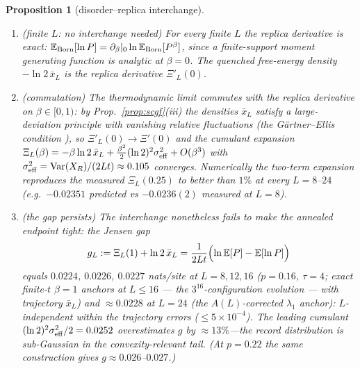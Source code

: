 \documentclass[11pt]{article}
\newtheorem{proposition}{Proposition}
\newcommand{\E}{\mathbb{E}}
\begin{document}
\begin{proposition}[disorder--replica interchange]\label{prop:replica}
\begin{enumerate}
\item[(i)] \emph{(finite $L$: no interchange needed)} For every finite $L$
      the replica derivative is exact: $\E_{\rm Born}[\ln P]
      =\partial_\beta|_0\ln\E_{\rm Born}[P^\beta]$, since a finite-support
      moment generating function is analytic at $\beta=0$.  The quenched
      free-energy density $-\ln2\,\bar x_L$ \emph{is} the replica
      derivative $\Xi'_L(0)$.
\item[(ii)] \emph{(commutation)} The thermodynamic limit commutes with the
      replica derivative on $\beta\in[0,1)$: by
      Prop.~\ref{prop:scgf}(iii) the densities $\bar x_L$ satisfy a
      large-deviation principle with vanishing relative fluctuations
      (the G\"artner--Ellis condition
      \citep{DemboZeitouni1998}), so $\Xi'_L(0)\to\Xi'(0)$ and the cumulant
      expansion
      $\Xi_L(\beta)=-\beta\ln2\,\bar x_L
      +\tfrac{\beta^2}{2}(\ln2)^2\sigma^2_{\rm eff}+O(\beta^3)$
      with $\sigma^2_{\rm eff}=\mathrm{Var}(X_R)/(2Lt)\approx0.105$
      converges.  Numerically the two-term expansion reproduces the
      measured $\Xi_L(0.25)$ to better than $1\%$ at every $L=8$--$24$
      (e.g.\ $-0.02351$ predicted vs $-0.0236(2)$ measured at $L=8$).
\item[(iii)] \emph{(the gap persists)} The interchange nonetheless fails
      to make the annealed endpoint tight: the Jensen gap
      \begin{equation}
        g_L:=\Xi_L(1)+\ln2\,\bar x_L
        =\frac{1}{2Lt}\Bigl(\ln\E[P]-\E[\ln P]\Bigr)
        \label{eq:gap}
      \end{equation}
      equals $0.0224$, $0.0226$, $0.0227$ nats/site at
      $L=8,12,16$ ($p=0.16$, $\tau=4$; exact finite-$t$ $\beta=1$ anchors at
      $L\le16$ — the $3^{16}$-configuration evolution — with trajectory
      $\bar x_L$) and $\approx0.0228$ at $L=24$ (the $A(L)$-corrected
      $\lambda_1$ anchor): $L$-independent within the trajectory errors
      ($\le5\times10^{-4}$).
      The leading cumulant $(\ln2)^2\sigma^2_{\rm eff}/2=0.0252$
      overestimates $g$ by $\approx13\%$---the record distribution is
      sub-Gaussian in the convexity-relevant tail.  (At $p=0.22$ the same
      construction gives $g\approx0.026$--$0.027$.)
\end{enumerate}
\end{proposition}
\end{document}
